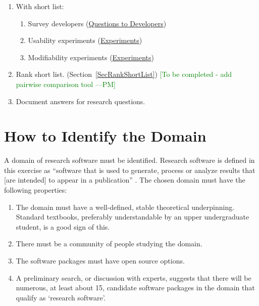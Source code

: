 \documentclass[letterpaper,cleveref]{lipics-v2019}
\newcommand{\authornote}[3]{\textcolor{#1}{[#3 ---#2]}}
\newcommand{\authornote}[3]{}
\newcommand{\wss}[1]{\authornote{blue}{SS}{#1}} %
\newcommand{\pmi}[1]{\authornote{green}{PM}{#1}} %
\theoremstyle{definition}
\begin{document}
\begin{enumerate}
\item With short list:
\begin{enumerate}
\item Survey developers
  (\href{https://github.com/smiths/AIMSS/blob/master/StateOfPractice/Methodology/Questions
    to Developers.pdf}{Questions to Developers})
\item Usability experiments
  (\href{https://github.com/smiths/AIMSS/blob/master/StateOfPractice/Methodology/Experiments.pdf}{Experiments})
\item Modifiability experiments
  (\href{https://github.com/smiths/AIMSS/blob/master/StateOfPractice/Methodology/Experiments.pdf}{Experiments})
\end{enumerate}
\item Rank short list. (Section~\ref{SecRankShortList}) \pmi{To be completed -
    add pairwise comparison tool}
\item Document answers for research questions.
\end{enumerate}


\section{How to Identify the Domain} \label{SecIdentifyDomain} 

A domain of research software must be identified. Research software is defined
in this exercise as ``software that is used to generate, process or analyze
results that [are intended] to appear in a publication''
\citep{hettrick2014uk}. The chosen domain must have the following properties:

\begin{enumerate}
\item The domain must have a well-defined, stable theoretical
  underpinning. Standard textbooks, preferably understandable by an upper
  undergraduate student, is a good sign of this.
\item There must be a community of people studying the domain.
\item The software packages must have open source options.
\item A preliminary search, or discussion with experts, suggests that there will
  be numerous, at least about 15, candidate software packages in the domain that
  qualify as `research software'.
\end{enumerate}	
\end{document}
